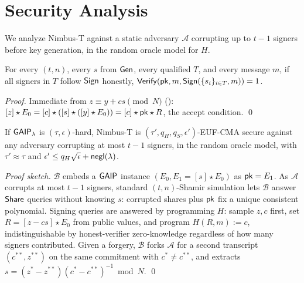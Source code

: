 \section{Security Analysis}
\label{sec:security}

We analyze Nimbus-T against a static adversary $\mathcal{A}$ corrupting up to $t-1$ signers before key generation, in the random oracle model for $H$.

\begin{theorem}[Correctness]
\label{thm:correctness}
For every $(t,n)$, every $s$ from $\mathsf{Gen}$, every qualified $T$, and every message $m$, if all signers in $T$ follow $\mathsf{Sign}$ honestly, $\mathsf{Verify}(\mathsf{pk},m,\mathsf{Sign}(\{s_i\}_{i\in T},m)) = 1$.
\end{theorem}
\begin{proof}
Immediate from $z \equiv y+cs \pmod N$ (): $[z]\star E_0 = [c]\star([s]\star([y]\star E_0)) = [c]\star\mathsf{pk}\star R$, the accept condition. \qed
\end{proof}

\begin{theorem}
\label{thm:euf-cma}
If $\mathsf{GAIP}_\lambda$ is $(\tau,\epsilon)$-hard, Nimbus-T is $(\tau', q_H, q_S, \epsilon')$-EUF-CMA secure against any adversary corrupting at most $t-1$ signers, in the random oracle model, with $\tau'\approx\tau$ and $\epsilon' \le q_H\sqrt{\epsilon} + \mathsf{negl}(\lambda)$.
\end{theorem}
\begin{proof}[Proof sketch]
$\mathcal{B}$ embeds a $\mathsf{GAIP}$ instance $(E_0, E_1=[s]\star E_0)$ as $\mathsf{pk}=E_1$. As $\mathcal{A}$ corrupts at most $t-1$ signers, standard $(t,n)$-Shamir simulation lets $\mathcal{B}$ answer $\mathsf{Share}$ queries without knowing $s$: corrupted shares plus $\mathsf{pk}$ fix a unique consistent polynomial. Signing queries are answered by programming $H$: sample $z,c$ first, set $R=[z-cs]\star E_0$ from public values, and program $H(R,m):=c$, indistinguishable by honest-verifier zero-knowledge regardless of how many signers contributed. Given a forgery, $\mathcal{B}$ forks $\mathcal{A}$ for a second transcript $(c^{**},z^{**})$ on the same commitment with $c^*\ne c^{**}$, and extracts $s=(z^*-z^{**})(c^*-c^{**})^{-1}\bmod N$. \qed
\end{proof}

